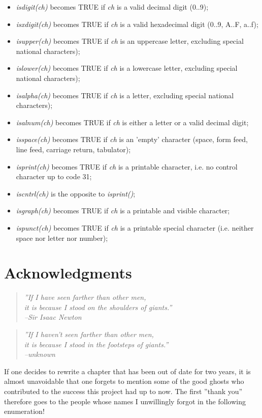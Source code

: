 \documentclass[12pt,twoside]{report}
\begin{document}
\begin{itemize}
\item{{\em isdigit(ch)} becomes TRUE if {\em ch} is a valid decimal
      digit (0..9);}
\item{{\em isxdigit(ch)} becomes TRUE if {\em ch} is a valid hexadecimal
      digit (0..9, A..F, a..f);}
\item{{\em isupper(ch)} becomes TRUE if {\em ch} is an uppercase
      letter, excluding special national characters);}
\item{{\em islower(ch)} becomes TRUE if {\em ch} is a lowercase
      letter, excluding special national characters);}
\item{{\em isalpha(ch)} becomes TRUE if {\em ch} is a letter, excluding
      special national characters);}
\item{{\em isalnum(ch)} becomes TRUE if {\em ch} is either a letter or
      a valid decimal digit;}
\item{{\em isspace(ch)} becomes TRUE if {\em ch} is an 'empty' character
      (space, form feed, line feed, carriage return, tabulator);}
\item{{\em isprint(ch)} becomes TRUE if {\em ch} is a printable character,
      i.e. no control character up to code 31;}
\item{{\em iscntrl(ch)} is the opposite to {\em isprint()};}
\item{{\em isgraph(ch)} becomes TRUE if {\em ch} is a printable and
      visible character;}
\item{{\em ispunct(ch)} becomes TRUE if {\em ch} is a printable special
      character (i.e. neither space nor letter nor number);}
\end{itemize}


\cleardoublepage
\chapter{Acknowledgments}

\begin{quote}\it
''If I have seen farther than other men, \\
it is because I stood on the shoulders of giants.'' \\
\hspace{2cm} --Sir Isaac Newton
\rm\end{quote}
\begin{quote}\it
''If I haven't seen farther than other men, \\
it is because I stood in the footsteps of giants.'' \\
\hspace{2cm} --unknown
\rm\end{quote}
\par
If one decides to rewrite a chapter that has been out of date for two
years, it is almost unavoidable that one forgets to mention some of
the good ghosts who contributed to the success this project had up
to now.  The first ''thank you'' therefore goes to the people whose
names I unwillingly forgot in the following enumeration!
\end{document}
